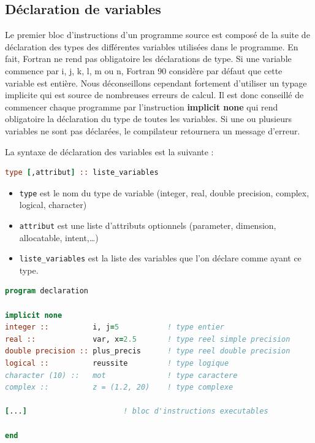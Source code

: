 \documentclass[a4paper,twoside]{article}
\begin{document}
\subsection{Déclaration de variables}
Le premier bloc d'instructions d'un programme source est composé de la suite de déclaration des types des différentes variables utilisées dans le programme. En fait, Fortran ne rend pas obligatoire les déclarations de type. Si une variable commence par i, j, k, l, m ou n, Fortran 90 considère par défaut que cette variable est entière. Nous déconseillons cependant fortement d'utiliser un typage implicite qui est source de nombreuses erreurs de calcul. Il est donc conseillé de commencer chaque programme par l'instruction \textbf{implicit none} qui rend obligatoire la déclaration du type de toutes les variables. Si une ou plusieurs variables ne sont pas déclarées, le compilateur retournera un message d'erreur.

La syntaxe de déclaration des variables est la suivante : 
\begin{lstlisting}[language=Fortran]
type [,attribut] :: liste_variables
\end{lstlisting}
\begin{itemize}
\item \texttt{type} est le nom du type de variable (integer, real, double precision, complex, logical, character)
\item \texttt{attribut} est une liste d'attributs optionnels (parameter, dimension, allocatable, intent,\dots)
\item \texttt{liste\_variables} est la liste des variables que l'on déclare comme ayant ce type.
\end{itemize}

\begin{exemple}
\begin{lstlisting}[language=Fortran]
program declaration
       
implicit none          
integer ::          i, j=5           ! type entier
real ::             var, x=2.5       ! type reel simple precision 
double precision :: plus_precis      ! type reel double precision 
logical ::          reussite         ! type logique 
character (10) ::   mot              ! type caractere
complex ::          z = (1.2, 20)    ! type complexe
   
[...]                      ! bloc d'instructions executables
      
end
\end{lstlisting}
\end{exemple}
\end{document}
